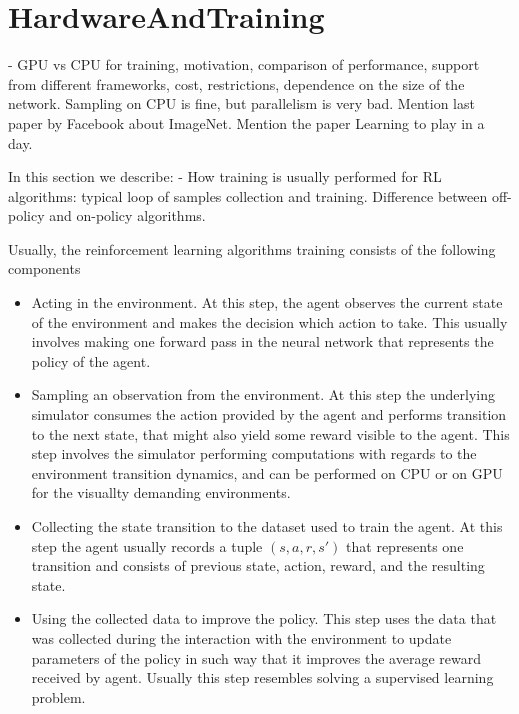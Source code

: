 \section{HardwareAndTraining}


- GPU vs CPU for training, motivation, comparison of performance, support
  from different frameworks, cost, restrictions, dependence on the size of
  the network. Sampling on CPU is fine, but parallelism is very bad.
  Mention last paper by Facebook about ImageNet. Mention the paper Learning
  to play in a day.

In this section we describe:
- How training is usually performed for RL algorithms: typical loop of samples collection
and training. Difference between off-policy and on-policy algorithms.

Usually, the reinforcement learning algorithms training consists of the following components

\begin{itemize}
    \item Acting in the environment. At this step, the agent observes the current state of the
    environment and makes the decision which action to take. This usually involves making one
    forward pass in the neural network that represents the policy of the agent.

    \item Sampling an observation from the environment. At this step the underlying simulator consumes
    the action provided by the agent and performs transition to the next state, that might also
    yield some reward visible to the agent. This step involves the simulator performing computations
    with regards to the environment transition dynamics, and can be performed on CPU or on GPU for
    the visuallty demanding environments.

    \item Collecting the state transition to the dataset used to train the agent. At this step
    the agent usually records a tuple $(s, a, r, s')$ that represents one transition and
    consists of previous state, action, reward, and the resulting state.

    \item Using the collected data to improve the policy. This step uses the data that was collected
    during the interaction with the environment to update parameters of the policy in such way that
    it improves the average reward received by agent. Usually this step resembles solving a
    supervised learning problem.
\end{itemize}

